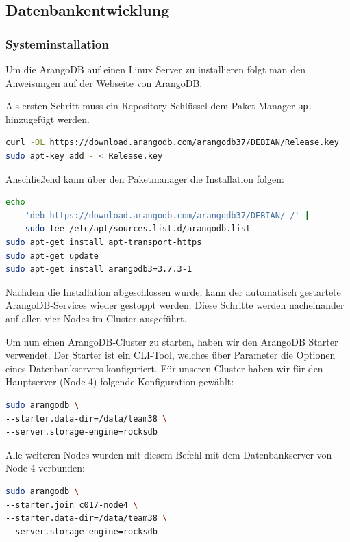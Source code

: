 \subsection{Datenbankentwicklung}
\subsubsection{Systeminstallation}
Um die ArangoDB auf einen Linux Server zu installieren folgt man den Anweisungen auf der Webseite von ArangoDB.

Als ersten Schritt muss ein Repository-Schlüssel dem Paket-Manager \texttt{apt} hinzugefügt werden.
\begin{lstlisting}[language=bash]
curl -OL https://download.arangodb.com/arangodb37/DEBIAN/Release.key
sudo apt-key add - < Release.key
\end{lstlisting}
Anschließend kann über den Paketmanager die Installation folgen:
\begin{lstlisting}[language=bash]
echo 
	'deb https://download.arangodb.com/arangodb37/DEBIAN/ /' | 
	sudo tee /etc/apt/sources.list.d/arangodb.list
sudo apt-get install apt-transport-https
sudo apt-get update
sudo apt-get install arangodb3=3.7.3-1
\end{lstlisting}
Nachdem die Installation abgeschlossen wurde, kann der automatisch gestartete ArangoDB-Services wieder gestoppt werden. Diese Schritte werden nacheinander auf allen vier Nodes im Cluster ausgeführt. \cite{ADB_install}

Um nun einen ArangoDB-Cluster zu starten, haben wir den ArangoDB Starter verwendet. Der Starter ist ein \ac{CLI}-Tool, welches über Parameter die Optionen eines Datenbankservers konfiguriert. 
Für unseren Cluster haben wir für den Hauptserver (Node-4) folgende Konfiguration gewählt:
\begin{lstlisting}[language=bash]
sudo arangodb \
--starter.data-dir=/data/team38 \
--server.storage-engine=rocksdb
\end{lstlisting}
Alle weiteren Nodes wurden mit diesem Befehl mit dem Datenbankserver von Node-4 verbunden:
\begin{lstlisting}[language=bash]
sudo arangodb \
--starter.join c017-node4 \
--starter.data-dir=/data/team38 \
--server.storage-engine=rocksdb
\end{lstlisting}
\citep{ADB_starter}


